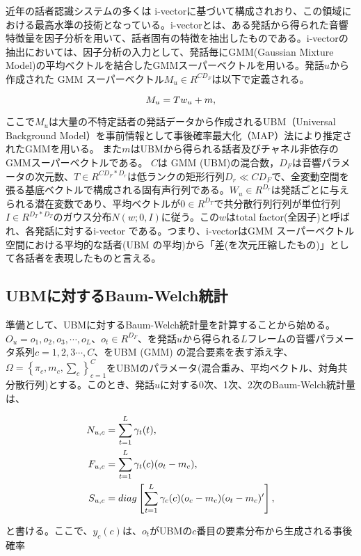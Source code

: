 近年の話者認識システムの多くは i-vector\cite{iv}に基づいて構成されおり、この領域における最高水準の技術となっている。i-vectorとは、ある発話から得られた音響特徴量を因子分析を用いて、話者固有の特徴を抽出したものである。i-vectorの抽出においては、因子分析の入力として、発話毎にGMM(Gaussian Mixture Model)の平均ベクトルを結合したGMMスーパーベクトルを用いる。発話$u$から作成された GMM スーパーベクトル$M_u∈R^{CD_F}$は以下で定義される。

\begin{equation}
M_u=T w_u + m, \notag
\end{equation}

ここで$M_u$は大量の不特定話者の発話データから作成されるUBM（Universal Background Model）を事前情報として事後確率最大化（MAP）法により推定されたGMMを用いる。
また$m$はUBMから得られる話者及びチャネル非依存のGMMスーパーベクトルである。
$C$は GMM (UBM)の混合数，$D_F$は音響パラメータの次元数、$T∈R^{CD_F*D_r}$は低ランクの矩形行列$D_r \ll CD_F$で、全変動空間を張る基底ベクトルで構成される固有声行列である。$W_u \in R^{D_r}$は発話ごとに与えられる潜在変数であり、平均ベクトルが$0 \in R^{D_T}$で共分散行列行列が単位行列$I \in R^{D_T*D_T}$のガウス分布$N(w ; 0,I)$に従う。この$w$はtotal factor(全因子)と呼ばれ、各発話に対するi-vector である。つまり、i-vectorはGMM スーパーベクトル空間における平均的な話者(UBM の平均)から「差(を次元圧縮したもの)」として各話者を表現したものと言える。

\subsection{UBMに対するBaum-Welch統計}
準備として、UBMに対するBaum-Welch統計量を計算することから始める。
$O_u={o_1,o_2,o_3,\cdots,o_L}$、$o_t\in R^{D_F}$、を発話$u$から得られる$L$フレームの音響パラメータ系列$c=1,2,3\cdots,C$、をUBM (GMM) の混合要素を表す添え字、$\Omega=\left\{\pi_c,m_c,\sum_{c}\right\}_{c=1}^{C}$をUBMのパラメータ(混合重み、平均ベクトル、対角共分散行列)とする。このとき、発話$u$に対する0次、1次、2次のBaum-Welch統計量は、

\begin{align}
N_{u,c} &=\sum_{t=1}^{L}\gamma_t(t), \notag \\
F_{u,c} &=\sum_{t=1}^{L}\gamma_t(c)(o_t-m_c), \notag \\
S_{u,c} &=diag\left[\sum_{t=1}^L\gamma_c(c)(o_c-m_c)(o_t-m_c)^\prime\right] \notag ,
\end{align}



と書ける。ここで、$y_c(c)$は、$o_t$がUBMの$c$番目の要素分布から生成される事後確率

